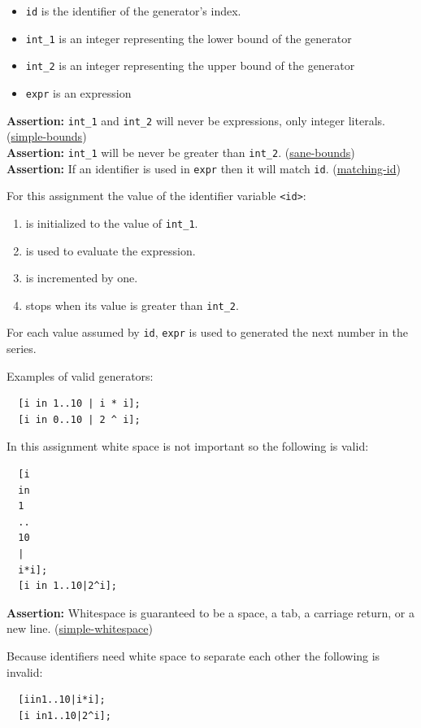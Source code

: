 \documentclass{article}
\newcommand{\code}[1]{\texttt{\textmd{#1}}}
\newcommand{\assertion}[2]{\textbf{Assertion: }#1 (\hyperlink{#2}{#2})}
\begin{document}
\begin{itemize}
  \item \code{id} is the identifier of the generator's index.
  \item{\code{int\_1}} is an integer representing the lower bound of the generator
  \item{\code{int\_2}} is an integer representing the upper bound of the generator
  \item{\code{expr}} is an expression
\end{itemize}

\assertion{\code{int\_1} and \code{int\_2} will never be expressions, only integer literals.}
{simple-bounds} \\
\assertion{\code{int\_1} will be never be greater than \code{int\_2}.}{sane-bounds}\\
\assertion{If an identifier is used in \code{expr} then it will match \code{id}.}{matching-id}

For this assignment the value of the identifier variable \code{<id>}:
\begin{enumerate}
  \item is initialized to the value of \code{int\_1}.
  \item is used to evaluate the expression.
  \item is incremented by one.
  \item stops when its value is greater than \code{int\_2}.
\end{enumerate}
For each value assumed by \code{id}, \code{expr} is used to generated the next number in the
series.

Examples of valid generators:
\begin{lstlisting}
  [i in 1..10 | i * i];
  [i in 0..10 | 2 ^ i];
\end{lstlisting}

In this assignment white space is not important so the following is valid:

\begin{lstlisting}
  [i
  in
  1
  ..
  10
  |
  i*i];
  [i in 1..10|2^i];
\end{lstlisting}

\assertion{Whitespace is guaranteed to be a space, a tab, a carriage return, or a new
line.}{simple-whitespace}

Because identifiers need white space to separate each other the following is invalid:
\begin{lstlisting}
  [iin1..10|i*i];
  [i in1..10|2^i];
\end{lstlisting}
\end{document}
